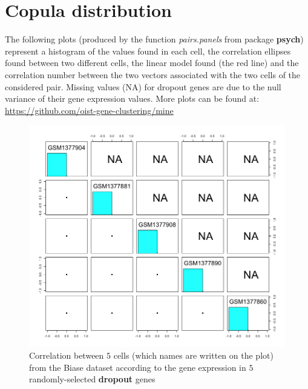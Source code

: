 \documentclass{report}
\begin{document}
{\section*{Copula distribution}

The following plots (produced by the function \textit{pairs.panels} from package \textbf{psych}) represent a histogram of the values found in each cell, the correlation ellipses found between two different cells, the linear model found (the red line) and the correlation number between the two vectors associated with the two cells of the considered pair. Missing values (NA) for dropout genes are due to the null variance of their gene expression values. More plots can be found at: {\url{https://github.com/oist-gene-clustering/mine}}\\



\begin{figure}[H]
\centering
\includegraphics[scale=0.4]{plotsCopula/biase/depCellnGene_dropout_biase.png}
\caption{Correlation between $5$ cells (which names are written on the plot) from the Biase dataset according to the gene expression in $5$ randomly-selected \textbf{dropout} genes}
\label{cellcorrelationdropout3}
\end{figure}

}
\end{document}
